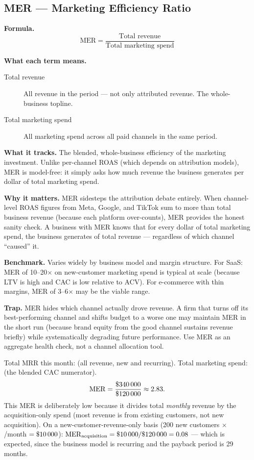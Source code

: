\subsection{MER --- Marketing Efficiency Ratio}

\textbf{Formula.}
\[
  \mathrm{MER} = \frac{\text{Total revenue}}{\text{Total marketing spend}}
\]

\textbf{What each term means.}
\begin{description}
  \item[Total revenue] All revenue in the period --- not only attributed revenue. The
    whole-business topline.
  \item[Total marketing spend] All marketing spend across all paid channels in the same
    period.
\end{description}

\textbf{What it tracks.} The blended, whole-business efficiency of the marketing investment.
Unlike per-channel ROAS (which depends on attribution models), MER is model-free: it simply
asks how much revenue the business generates per dollar of total marketing spend.

\textbf{Why it matters.} MER sidesteps the attribution debate entirely. When channel-level
ROAS figures from Meta, Google, and TikTok sum to more than total business revenue (because
each platform over-counts), MER provides the honest sanity check. A business with 
MER knows that for every dollar of total marketing spend, the business generates  of
total revenue --- regardless of which channel ``caused'' it.

\textbf{Benchmark.} Varies widely by business model and margin structure. For SaaS:
MER of 10--20$\times$ on new-customer marketing spend is typical at scale (because LTV is
high and CAC is low relative to ACV). For e-commerce with thin margins, MER of 3--6$\times$
may be the viable range.

\textbf{Trap.} MER hides which channel actually drove revenue. A firm that turns off its
best-performing channel and shifts budget to a worse one may maintain MER in the short
run (because brand equity from the good channel sustains revenue briefly) while
systematically degrading future performance. Use MER as an aggregate health check, not a
channel allocation tool.

\begin{example}
Total MRR this month:  (all revenue, new and recurring). Total marketing
spend:  (the blended CAC numerator).
\[
  \mathrm{MER} = \frac{\$\num{340000}}{\$\num{120000}} \approx 2.83.
\]
This MER is deliberately low because it divides total \emph{monthly} revenue by the
acquisition-only spend (most revenue is from existing customers, not new acquisition).
On a new-customer-revenue-only basis (200 new customers $\times$ /month
$= \$\num{10000}$): $\mathrm{MER}_\text{acquisition} = \$\num{10000}/\$\num{120000}
= 0.08$ --- which is expected, since the business model is recurring and the payback
period is 29 months.
\end{example}


